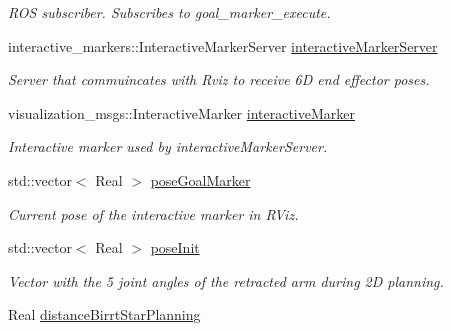 \begin{DoxyCompactItemize}
\begin{DoxyCompactList}\small\item\em R\-O\-S subscriber. Subscribes to goal\-\_\-marker\-\_\-execute. \end{DoxyCompactList}\item 
\hypertarget{classSquirrelMotionPlanner_1_1Planner_a09904527326121bd2d4d073aefaebae0}{interactive\-\_\-markers\-::\-Interactive\-Marker\-Server \hyperlink{classSquirrelMotionPlanner_1_1Planner_a09904527326121bd2d4d073aefaebae0}{interactive\-Marker\-Server}}\label{classSquirrelMotionPlanner_1_1Planner_a09904527326121bd2d4d073aefaebae0}

\begin{DoxyCompactList}\small\item\em Server that commuincates with Rviz to receive 6\-D end effector poses. \end{DoxyCompactList}\item 
\hypertarget{classSquirrelMotionPlanner_1_1Planner_aad666531f05d04ec62293f177dd93413}{visualization\-\_\-msgs\-::\-Interactive\-Marker \hyperlink{classSquirrelMotionPlanner_1_1Planner_aad666531f05d04ec62293f177dd93413}{interactive\-Marker}}\label{classSquirrelMotionPlanner_1_1Planner_aad666531f05d04ec62293f177dd93413}

\begin{DoxyCompactList}\small\item\em Interactive marker used by interactive\-Marker\-Server. \end{DoxyCompactList}\item 
\hypertarget{classSquirrelMotionPlanner_1_1Planner_a7e6fea3cb4c74dbd612554508c5ab3c5}{std\-::vector$<$ Real $>$ \hyperlink{classSquirrelMotionPlanner_1_1Planner_a7e6fea3cb4c74dbd612554508c5ab3c5}{pose\-Goal\-Marker}}\label{classSquirrelMotionPlanner_1_1Planner_a7e6fea3cb4c74dbd612554508c5ab3c5}

\begin{DoxyCompactList}\small\item\em Current pose of the interactive marker in R\-Viz. \end{DoxyCompactList}\item 
\hypertarget{classSquirrelMotionPlanner_1_1Planner_aa2c99667a318f73c089de92e3fcc4bc1}{std\-::vector$<$ Real $>$ \hyperlink{classSquirrelMotionPlanner_1_1Planner_aa2c99667a318f73c089de92e3fcc4bc1}{pose\-Init}}\label{classSquirrelMotionPlanner_1_1Planner_aa2c99667a318f73c089de92e3fcc4bc1}

\begin{DoxyCompactList}\small\item\em Vector with the 5 joint angles of the retracted arm during 2\-D planning. \end{DoxyCompactList}\item 
\hypertarget{classSquirrelMotionPlanner_1_1Planner_a65871b26093a618442ed4c8e578e936b}{Real \hyperlink{classSquirrelMotionPlanner_1_1Planner_a65871b26093a618442ed4c8e578e936b}{distance\-Birrt\-Star\-Planning}}\label{classSquirrelMotionPlanner_1_1Planner_a65871b26093a618442ed4c8e578e936b}


\end{DoxyCompactItemize}
